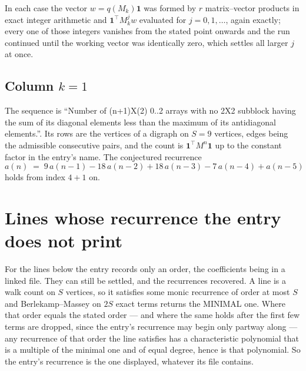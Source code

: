 \documentclass[11pt,a4paper]{article}
\theoremstyle{plain}
\theoremstyle{definition}
\begin{document}
In each case the vector $w=q(M_k)\mathbf{1}$ was formed by $r$ matrix--vector products in
exact integer arithmetic and $\mathbf{1}^{\!\top}M_k^{j}w$ evaluated for $j=0,1,\dots$,
again exactly; every one of those integers vanishes from the stated point onwards and the run
continued until the working vector was identically zero, which settles all larger $j$ at once.

\subsection*{Column $k$$=1$}
The sequence is ``Number of (n+1)X(2) 0..2 arrays with no 2X2 subblock having the sum of its diagonal elements less than the maximum of its antidiagonal elements.''. Its rows are the vertices of a digraph on
$S=9$ vertices, edges being the admissible consecutive pairs, and the count is
$\mathbf{1}^{\!\top}M^{n}\mathbf{1}$ up to the constant factor in the entry's name.
The conjectured recurrence
\[
a(n)\;=\;9\,a(n-1) - 18\,a(n-2) + 18\,a(n-3) - 7\,a(n-4) + a(n-5)
\]
holds from index $4+1$ on.


\section{Lines whose recurrence the entry does not print}

For the lines below the entry records only an order, the coefficients being in a linked file.
They can still be settled, and the recurrences recovered. A line is a walk count on $S$
vertices, so it satisfies some monic recurrence of order at most $S$ and Berlekamp--Massey on
$2S$ exact terms returns the MINIMAL one. Where that order equals the stated order --- and
where the same holds after the first few terms are dropped, since the entry's recurrence may
begin only partway along --- any recurrence of that order the line satisfies has a
characteristic polynomial that is a multiple of the minimal one and of equal degree, hence is
that polynomial. So the entry's recurrence is the one displayed, whatever its file contains.
\end{document}
